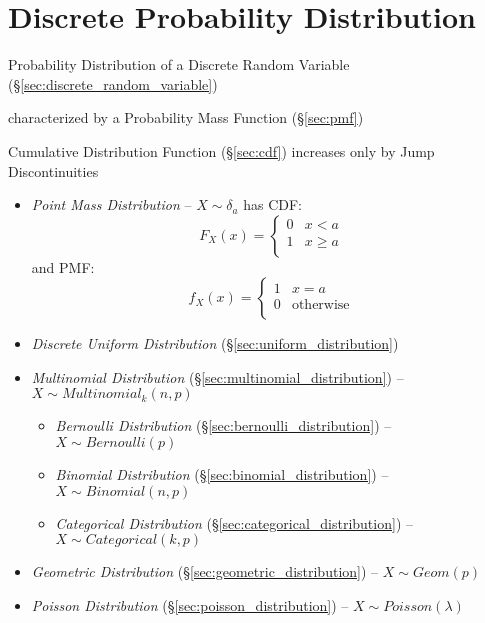 \section{Discrete Probability Distribution}\label{sec:discrete_probability}

Probability Distribution of a Discrete Random Variable
(\S\ref{sec:discrete_random_variable})

characterized by a Probability Mass Function (\S\ref{sec:pmf})

Cumulative Distribution Function (\S\ref{sec:cdf}) increases only by Jump
Discontinuities

\begin{itemize}
  \item \emph{Point Mass Distribution} -- $X \sim \delta_a$ has CDF:
    \[
      F_X(x) = \begin{cases}
        0 & x <    a \\
        1 & x \geq a \\
      \end{cases}
    \]
    and PMF:
    \[
      f_X(x) = \begin{cases}
        1 & x = a \\
        0 & \text{otherwise} \\
      \end{cases}
    \]
  \item \emph{Discrete Uniform Distribution} (\S\ref{sec:uniform_distribution})
  \item \emph{Multinomial Distribution} (\S\ref{sec:multinomial_distribution})
    -- $X \sim Multinomial_k(n,p)$
  \begin{itemize}
    \item \emph{Bernoulli Distribution} (\S\ref{sec:bernoulli_distribution}) --
      $X \sim Bernoulli(p)$
    \item \emph{Binomial Distribution} (\S\ref{sec:binomial_distribution}) --
      $X \sim Binomial(n,p)$
    \item \emph{Categorical Distribution} (\S\ref{sec:categorical_distribution})
      -- $X \sim Categorical(k,p)$
  \end{itemize}
  \item \emph{Geometric Distribution} (\S\ref{sec:geometric_distribution}) --
    $X \sim Geom(p)$
  \item \emph{Poisson Distribution} (\S\ref{sec:poisson_distribution}) --
    $X \sim Poisson(\lambda)$
\end{itemize}



